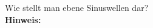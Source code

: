 \begin{question}[section=5,subsection=52,name={Sinuswelle},difficulty=4,type=mdl,mode=exm,tags={}]
	Wie stellt man ebene Sinuswellen dar?
	\\ \textbf{Hinweis:}\\
	
\end{question}
\begin{solution}
	
\end{solution}